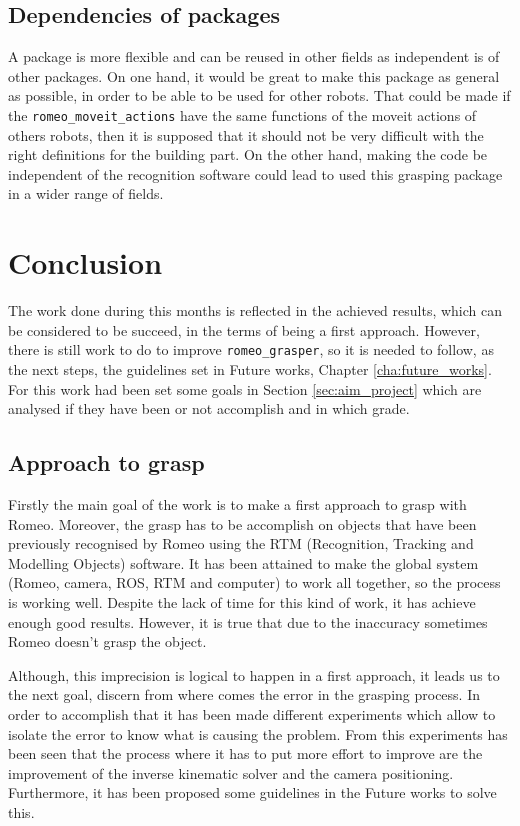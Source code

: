 \documentclass[12pt,a4paper,final,twoside,openright]{report}
\begin{document}
\section{Dependencies of packages}

A package is more flexible and can be reused in other fields as independent is of other packages. On one hand, it would be great to make this package as general as possible, in order to be able to be used for other robots. That could be made if the \texttt{romeo\_moveit\_actions} have the same functions of the moveit actions of others robots, then it is supposed that it should not be very difficult with the right definitions for the building part. On the other hand, making the code be independent of the recognition software could lead to used this grasping package in a wider range of fields.


\chapter{Conclusion}
\label{cha:conclusions}

The work done during this months is reflected in the achieved results, which can be considered to be succeed, in the terms of being a first approach. However, there is still work to do to improve \texttt{romeo\_grasper}, so it is needed to follow, as the next steps, the guidelines set in Future works, Chapter \ref{cha:future_works}. For this work had been set some goals in Section \ref{sec:aim_project} which are analysed if they have been or not accomplish and in which grade. 

\section{Approach to grasp}

Firstly the main goal of the work is to make a first approach to grasp with Romeo. Moreover, the grasp has to be accomplish on objects that have been previously recognised by Romeo using the RTM (Recognition, Tracking and Modelling Objects) software. It has been attained to make the global system (Romeo, camera, ROS, RTM and computer) to work all together, so the process is working well. Despite the lack of time for this kind of work, it has achieve enough good results. However, it is true that due to the inaccuracy sometimes Romeo doesn't grasp the object. 

Although, this imprecision is logical to happen in a first approach, it leads us to the next goal, discern from where comes the error in the grasping process. In order to accomplish that it has been made different experiments which allow to isolate the error to know what is causing the problem. From this experiments has been seen that the process where it has to put more effort to improve are the improvement of the inverse kinematic solver and the camera positioning. Furthermore, it has been proposed some guidelines in the Future works to solve this.
\end{document}

